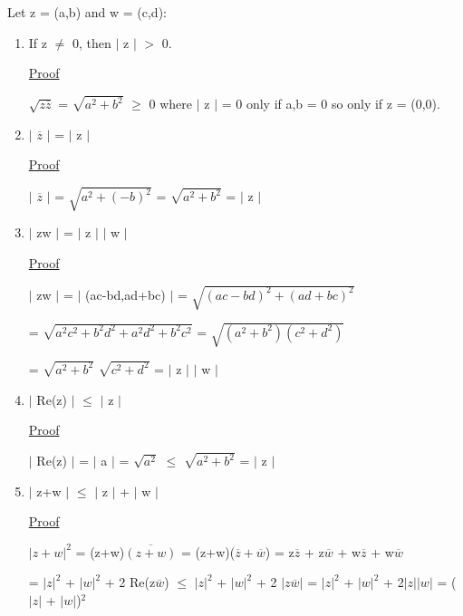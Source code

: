 	\qquad Let z = (a,b) and w = (c,d):
	\begin{enumerate}[label=(\alph*), leftmargin=2cm, itemsep=0.4em]
		\item If z $\neq$ 0, then $|$ z $|$ $>$ 0.

			{ \color{magenta} \underline{Proof} } 
			
				$\sqrt{z\overline{z}}$ = $\sqrt{a^2 + b^2}$ $\geq$ 0
				where $|$ z $|$ = 0 only if a,b = 0 so only if z = (0,0).

		\item $|$ $\overline{z}$ $|$ = $|$ z  $|$

			{ \color{magenta} \underline{Proof} } 
			
				$|$ $\overline{z}$ $|$ = $\sqrt{a^2 + (-b)^2}$ = $\sqrt{a^2 + b^2}$ = $|$ z $|$

		\item $|$ zw $|$ = $|$ z $|$ $|$ w $|$

			{ \color{magenta} \underline{Proof} } 
			
				$|$ zw $|$ = $|$ (ac-bd,ad+bc) $|$ = $\sqrt{(ac-bd)^2 + (ad+bc)^2}$
			
				= $\sqrt{a^2c^2 + b^2d^2 + a^2d^2 + b^2c^2}$
				= $\sqrt{(a^2+b^2)(c^2+d^2)}$

				= $\sqrt{a^2+b^2}$ $\sqrt{c^2+d^2}$ = $|$ z $|$ $|$ w $|$

		\item $|$ Re(z) $|$ $\leq$ $|$ z $|$

			{ \color{magenta} \underline{Proof} } 
			
				$|$ Re(z) $|$ = $|$ a $|$ = $\sqrt{a^2}$ $\leq$ $\sqrt{a^2+b^2}$ = $|$ z $|$

		\item $|$ z+w $|$ $ \leq $  $|$ z $|$ + $|$ w $|$

			{ \color{magenta} \underline{Proof} } 
			
				$| z+w |^2$ = (z+w)$\overline{(z+w)}$ = (z+w)($\overline{z} + \overline{w}$)
				= z$\overline{z}$ + z$\overline{w}$ + w$\overline{z}$ + w$\overline{w}$
			
				= $|z|^2$ + $|w|^2$ + 2 Re(z$\overline{w}$)
				$\leq$ $|z|^2$ + $|w|^2$ + 2 $|z\overline{w}|$
				= $|z|^2$ + $|w|^2$ + 2$|z||w|$
				= ($|z|$ + $|w|$)$^2$
	\end{enumerate}


